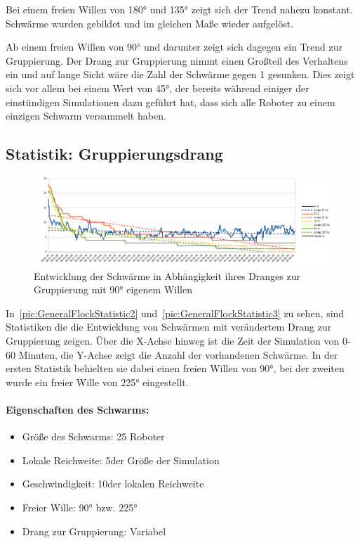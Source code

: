 Bei einem freien Willen von 180° und 135° zeigt sich der Trend nahezu konstant. Schwärme wurden gebildet und im gleichen Maße wieder aufgelöst.

Ab einem freien Willen von 90° und darunter zeigt sich dagegen ein Trend zur Gruppierung. Der Drang zur Gruppierung nimmt einen Großteil des Verhaltens ein und auf lange Sicht wäre die Zahl der Schwärme gegen 1 gesunken. Dies zeigt sich vor allem bei einem Wert von 45°, der bereits während einiger der einstündigen Simulationen dazu geführt hat, dass sich alle Roboter zu einem einzigen Schwarm versammelt haben.

\subsection*{Statistik: Gruppierungsdrang}

\begin{figure}
	\includegraphics[width=\textwidth, height=\statisticHeight]{graphics/Statistics/FlockGeneral/LocalRange1Speed01FreeWill90.png}
	\caption{Entwicklung der Schwärme in Abhängigkeit ihres Dranges zur Gruppierung mit 90° eigenem Willen}
	\label{pic:GeneralFlockStatistic2}
\end{figure}

In~\autoref{pic:GeneralFlockStatistic2} und~\autoref{pic:GeneralFlockStatistic3} zu sehen, sind Statistiken die die Entwicklung von Schwärmen mit verändertem Drang zur Gruppierung zeigen. Über die X-Achse hinweg ist die Zeit der Simulation von 0-60 Minuten, die Y-Achse zeigt die Anzahl der vorhandenen Schwärme. In der ersten Statistik behielten sie dabei einen freien Willen von 90°, bei der zweiten wurde ein freier Wille von 225° eingestellt.

\paragraph*{Eigenschaften des Schwarms:}
\begin{itemize}
	\item Größe des Schwarms: 25 Roboter
	\item Lokale Reichweite: 5\per der Größe der Simulation
	\item Geschwindigkeit: 10\per der lokalen Reichweite
	\item Freier Wille: 90° bzw. 225°
	\item Drang zur Gruppierung: Variabel
\end{itemize}


